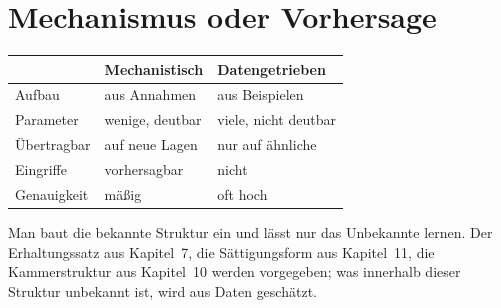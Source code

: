 \section{Mechanismus oder Vorhersage}

\begin{merksatz}
\begin{center}
{\small
\renewcommand{\arraystretch}{1.52}
\begin{tabular}{@{}P{2.0cm}P{2.9cm}P{3.3cm}@{}}
\toprule
& \textbf{Mechanistisch} & \textbf{Daten\-getrieben}\\
\midrule
Aufbau & aus Annahmen & aus Beispielen\\
Parameter & wenige, deutbar & viele, nicht deutbar\\
Übertragbar & \textcolor{gruen}{auf neue Lagen} & \textcolor{akzent}{nur auf ähnliche}\\
Eingriffe & \textcolor{gruen}{vorhersagbar} & \textcolor{akzent}{nicht}\\
Genauigkeit & \textcolor{mittel}{mäßig} & \textcolor{gruen}{oft hoch}\\
\bottomrule
\end{tabular}}
\end{center}

\begin{center}
\begin{minipage}{0.88\textwidth}
\end{minipage}
\end{center}

Man baut die bekannte Struktur ein und lässt nur das Unbekannte lernen. Der Erhaltungssatz aus Kapitel~7, die Sättigungsform aus Kapitel~11, die Kammerstruktur aus Kapitel~10 werden vorgegeben; was innerhalb dieser Struktur unbekannt ist, wird aus Daten geschätzt.

\begin{center}
\begin{minipage}{0.88\textwidth}
\end{minipage}
\end{center}
\end{merksatz}

